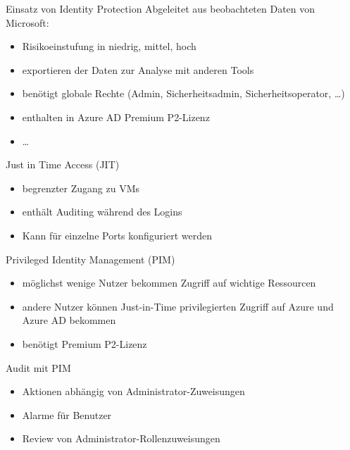 \begin{flashcard}[Definition]{Einsatz von Identity Protection}
  Abgeleitet aus beobachteten Daten von Microsoft:
  \begin{itemize}
    \item Risikoeinstufung in niedrig, mittel, hoch
    \item exportieren der Daten zur Analyse mit anderen Tools
    \item benötigt globale Rechte (Admin, Sicherheitsadmin, Sicherheitsoperator, \ldots)
    \item enthalten in Azure AD Premium P2-Lizenz
    \item \ldots
  \end{itemize}
\end{flashcard}

\begin{flashcard}[Definition]{Just in Time Access (JIT)}
  \begin{itemize}
    \item begrenzter Zugang zu VMs
    \item enthält Auditing während des Logins
    \item Kann für einzelne Ports konfiguriert werden
  \end{itemize}
\end{flashcard}

\begin{flashcard}[Definition]{Privileged Identity Management (PIM)}
  \begin{itemize}
    \item möglichst wenige Nutzer bekommen Zugriff auf wichtige Ressourcen
    \item andere Nutzer können Just-in-Time privilegierten Zugriff auf Azure und Azure AD bekommen
    \item benötigt Premium P2-Lizenz
  \end{itemize}
\end{flashcard}

\begin{flashcard}[]{Audit mit PIM}
  \begin{itemize}
    \item Aktionen abhängig von Administrator-Zuweisungen
    \item Alarme für Benutzer
    \item Review von Administrator-Rollenzuweisungen
  \end{itemize}
\end{flashcard}

